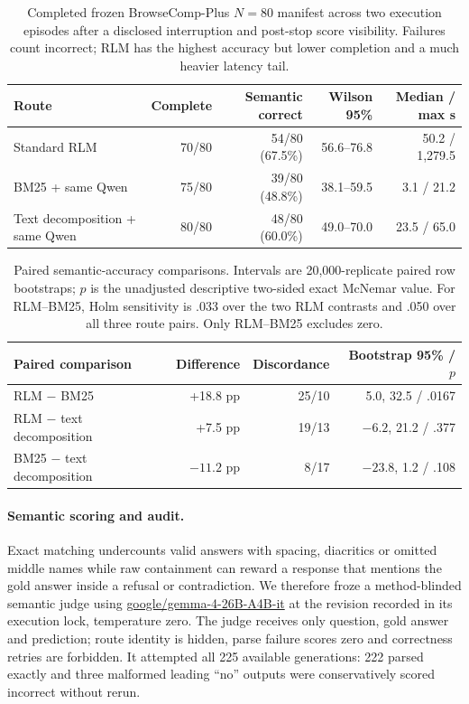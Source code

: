 \documentclass[letterpaper]{article}
\begin{document}
\begin{table}[!t]
\centering
\small
\setlength{\tabcolsep}{3pt}
\begin{tabular}{@{}lrrrr@{}}
\toprule
\textbf{Route} & \textbf{Complete} & \textbf{Semantic correct} & \textbf{Wilson 95\%} & \textbf{Median / max s} \\
\midrule
Standard RLM & 70/80 & 54/80 (67.5\%) & 56.6--76.8 & 50.2 / 1,279.5 \\
BM25 + same Qwen & 75/80 & 39/80 (48.8\%) & 38.1--59.5 & 3.1 / 21.2 \\
Text decomposition + same Qwen & 80/80 & 48/80 (60.0\%) & 49.0--70.0 & 23.5 / 65.0 \\
\bottomrule
\end{tabular}
\caption{Completed frozen BrowseComp-Plus $N=80$ manifest across two execution episodes after a disclosed interruption and post-stop score visibility. Failures count incorrect; RLM has the highest accuracy but lower completion and a much heavier latency tail.}
\label{tab:supp-browsecomp-primary}
\end{table}

\begin{table}[!t]
\centering
\small
\setlength{\tabcolsep}{3pt}
\begin{tabular}{@{}p{6.0cm}rrr@{}}
\toprule
\textbf{Paired comparison} & \textbf{Difference} & \textbf{Discordance} & \textbf{Bootstrap 95\% / $p$} \\
\midrule
RLM $-$ BM25 & +18.8 pp & 25/10 & 5.0, 32.5 / .0167 \\
RLM $-$ text decomposition & +7.5 pp & 19/13 & $-6.2$, 21.2 / .377 \\
BM25 $-$ text decomposition & $-11.2$ pp & 8/17 & $-23.8$, 1.2 / .108 \\
\bottomrule
\end{tabular}
\caption{Paired semantic-accuracy comparisons. Intervals are 20,000-replicate paired row bootstraps; $p$ is the unadjusted descriptive two-sided exact McNemar value. For RLM--BM25, Holm sensitivity is .033 over the two RLM contrasts and .050 over all three route pairs. Only RLM--BM25 excludes zero.}
\label{tab:supp-browsecomp-paired}
\end{table}

\paragraph{Semantic scoring and audit.}
Exact matching undercounts valid answers with spacing, diacritics or omitted middle names while raw containment can reward a response that mentions the gold answer inside a refusal or contradiction. We therefore froze a method-blinded semantic judge using \url{google/gemma-4-26B-A4B-it} at the revision recorded in its execution lock, temperature zero. The judge receives only question, gold answer and prediction; route identity is hidden, parse failure scores zero and correctness retries are forbidden. It attempted all 225 available generations: 222 parsed exactly and three malformed leading ``no'' outputs were conservatively scored incorrect without rerun.
\end{document}
